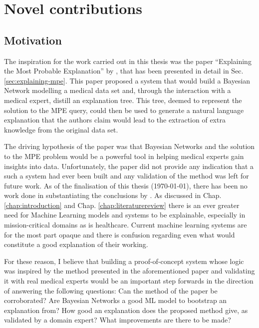 \section{Novel contributions}\label{sec:novel-contributions}
 \subsection{Motivation} 
 The inspiration for the work carried out in this thesis was the paper \enquote{Explaining the Most Probable Explanation} by \cite{Butz2018}, that has been presented in detail in Sec. \ref{sec:explaining-mpe}.
 This paper proposed a system that would build a Bayesian Network modelling a medical data set and, through the interaction with a medical expert, distill an explanation tree.
 This tree, deemed to represent the solution to the MPE query, could then be used to generate a natural language explanation that the authors claim would lead to the extraction of extra knowledge from the original data set.  

 The driving hypothesis of the paper was that Bayesian Networks and the solution to the MPE problem would be a powerful tool in helping medical experts gain insights into data.
 Unfortunately, the paper did not provide any indication that a such a system had ever been built and any validation of the method was left for future work.
 As of the finalisation of this thesis (\today), there has been no work done in substantiating the conclusions by \cite{Butz2018}. 
 As discussed in Chap. \ref{chap:introduction} and Chap. \ref{chap:literaturereview} there is an ever greater need for Machine Learning models and systems to be explainable, especially in mission-critical domains as is healthcare.
 Current machine learning systems are for the most part opaque and there is confusion regarding even what would constitute a good explanation of their working.
 
 For these reason, I believe that building a proof-of-concept system whose logic was inspired by the method presented in the aforementioned paper and validating it with real medical experts would be an important step forwards in the direction of answering the following questions:
 Can the method of the paper be corroborated?
 Are Bayesian Networks a good ML model to bootstrap an explanation from?
 How good an explanation does the proposed method give, as validated by a domain expert?
 What improvements are there to be made?

